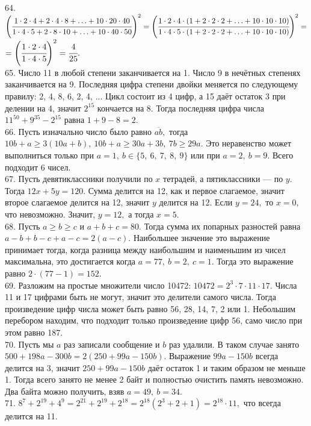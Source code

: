 64. $\left( \cfrac{1\cdot2\cdot4+2\cdot4\cdot8+\ldots+10\cdot20\cdot40}{1\cdot4\cdot5+2\cdot8\cdot10+\ldots+10\cdot40\cdot50}\right)^2=
\left( \cfrac{1\cdot2\cdot4\cdot(1+2\cdot2\cdot2+\ldots+10\cdot10\cdot10)}{1\cdot4\cdot5\cdot(1+2\cdot2\cdot2+\ldots+10\cdot10\cdot10)}\right)^2=$\\$=
\left( \cfrac{1\cdot2\cdot4}{1\cdot4\cdot5}\right)^2=\cfrac{4}{25}.$\\
65. Число 11 в любой степени заканчивается на 1. Число 9 в нечётных степенях заканчивается на 9. Последняя цифра степени двойки меняется по следующему правилу: 2, 4, 8, 6, 2, 4, ... Цикл состоит из 4 цифр, а 15 даёт остаток 3 при делении на 4, значит $2^{15}$ кончается на 8. Тогда последняя цифра числа $11^{50}+9^{35}-2^{15}$
равна $1+9-8=2.$\\
66. Пусть изначально число было равно  $\overline{ab},$ тогда $10b+a\geqslant3(10a+b),\ 10b+a\geqslant30a+3b,\ 7b\geqslant29a.$ Это неравенство может выполниться только при $a=1,\ b\in\{5,\ 6,\ 7,\ 8,\ 9\}$ или при $a=2,\ b=9.$ Всего подходит 6 чисел.\\
67. Пусть девятиклассники получили по $x$ тетрадей, а пятиклассники --- по $y.$ Тогда $12x+5y=120.$ Сумма делится на 12, как и первое слагаемое, значит второе слагаемое делится на 12, значит $y$ делится на 12. Если $y=24,$ то $x=0,$ что невозможно. Значит, $y=12,$ а тогда $x=5.$\\
68. Пусть $a\geqslant b\geqslant c$ и $a+b+c=80.$ Тогда сумма их попарных разностей равна $a-b+b-c+a-c=2(a-c).$ Наибольшее значение это выражение принимает тогда, когда разница между наибольшим и наименьшим из чисел максимальна, это достигается когда $a=77,\ b=2,\ c=1.$ Тогда это выражение равно $2\cdot(77-1)=152.$\\
69. Разложим на простые множители число 10472: $10472=2^3\cdot7\cdot11\cdot17.$ Числа 11 и 17 цифрами быть не могут, значит это делители самого числа. Тогда произведение цифр числа может быть равно 56, 28, 14, 7, 2 или 1. Небольшим перебором находим, что подходит только произведение цифр 56, само число при этом равно 187.\\
70. Пусть мы $a$ раз записали сообщение и $b$ раз удалили. В таком случае занято $500+198a-300b=2(250+99a-150b).$ Выражение $99a-150b$ всегда делится на 3, значит
$250+99a-150b$ даёт остаток 1 и таким образом не меньше 1. Тогда всего занято не менее 2 байт и полностью очистить память невозможно. Два байта можно получить, взяв $a=49,\ b=34.$\\
71. $8^7+2^{19}+4^9=2^{21}+2^{19}+2^{18}=2^{18}(2^3+2+1)=2^{18}\cdot11,$ что всегда делится на 11.\\
